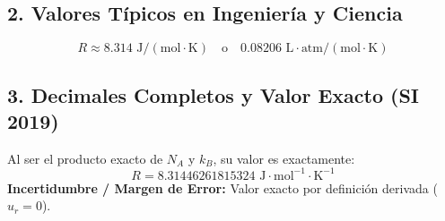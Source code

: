 \documentclass[12pt,a4paper]{article}
\begin{document}
\subsection*{2. Valores Típicos en Ingeniería y Ciencia}
\begin{equation*}
R \approx 8.314 \text{ J}/(\text{mol}\cdot\text{K}) \quad \text{o} \quad 0.08206 \text{ L}\cdot\text{atm}/(\text{mol}\cdot\text{K})
\end{equation*}

\subsection*{3. Decimales Completos y Valor Exacto (SI 2019)}
Al ser el producto exacto de $N_A$ y $k_B$, su valor es exactamente:
\begin{equation*}
R = 8.31446261815324 \text{ J}\cdot\text{mol}^{-1}\cdot\text{K}^{-1}
\end{equation*}
\textbf{Incertidumbre / Margen de Error:} Valor exacto por definición derivada ($u_r = 0$).
\end{document}
